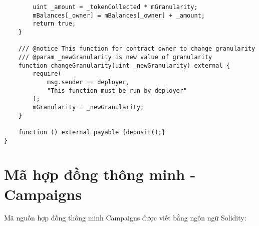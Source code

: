\documentclass[../main-report.tex]{subfiles}
\begin{document}
\begin{lstlisting}
        uint _amount = _tokenCollected * mGranularity;
        mBalances[_owner] = mBalances[_owner] + _amount;
        return true;
    }

    /// @notice This function for contract owner to change granularity
    /// @param _newGranularity is new value of granularity
    function changeGranularity(uint _newGranularity) external {
        require(
            msg.sender == deployer,
            "This function must be run by deployer"
        );
        mGranularity = _newGranularity;
    }

    function () external payable {deposit();}
}
\end{lstlisting}

\chapter{Mã hợp đồng thông minh - Campaigns}
Mã nguồn hợp đồng thông minh Campaigns được viết bằng ngôn ngữ Solidity:
\end{document}
